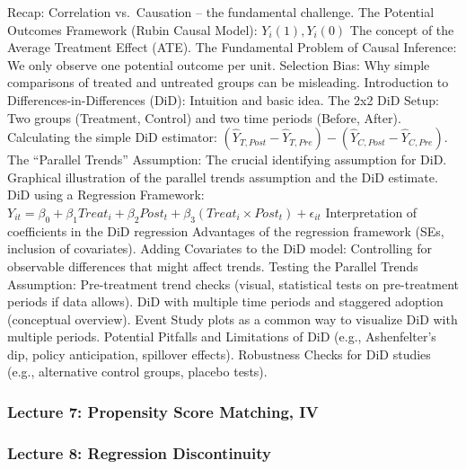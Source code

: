 \documentclass[
]{article}
\begin{document}
Recap: Correlation vs.~Causation -- the fundamental challenge. The
Potential Outcomes Framework (Rubin Causal Model): \(Y_i (1), Y_i (0)\)
The concept of the Average Treatment Effect (ATE). The Fundamental
Problem of Causal Inference: We only observe one potential outcome per
unit. Selection Bias: Why simple comparisons of treated and untreated
groups can be misleading. Introduction to Differences-in-Differences
(DiD): Intuition and basic idea. The 2x2 DiD Setup: Two groups
(Treatment, Control) and two time periods (Before, After). Calculating
the simple DiD estimator:
\((\hat{Y}_{T,Post} - \hat{Y}_{T, Pre}) - (\hat{Y}_{C, Post} - \hat{Y}_{C,Pre})\).
The ``Parallel Trends'' Assumption: The crucial identifying assumption
for DiD. Graphical illustration of the parallel trends assumption and
the DiD estimate. DiD using a Regression Framework:
\(Y_{it} = \beta_0 + \beta_1 Treat_i + \beta_2 Post_t + β_3 (Treat_i \times Post_t) + \epsilon_{it}\)
Interpretation of coefficients in the DiD regression Advantages of the
regression framework (SEs, inclusion of covariates). Adding Covariates
to the DiD model: Controlling for observable differences that might
affect trends. Testing the Parallel Trends Assumption: Pre-treatment
trend checks (visual, statistical tests on pre-treatment periods if data
allows). DiD with multiple time periods and staggered adoption
(conceptual overview). Event Study plots as a common way to visualize
DiD with multiple periods. Potential Pitfalls and Limitations of DiD
(e.g., Ashenfelter's dip, policy anticipation, spillover effects).
Robustness Checks for DiD studies (e.g., alternative control groups,
placebo tests).

\subsubsection{Lecture 7: Propensity Score Matching,
IV}\label{lecture-7-propensity-score-matching-iv}

\subsubsection{Lecture 8: Regression
Discontinuity}\label{lecture-8-regression-discontinuity}
\end{document}
